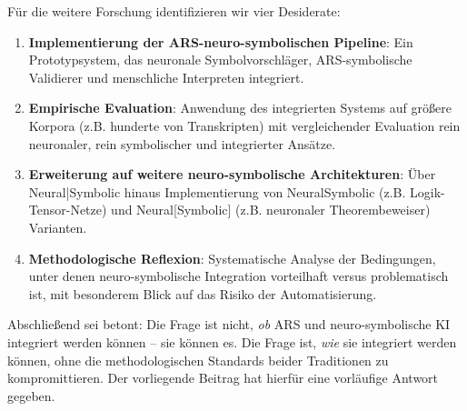 \documentclass[12pt,a4paper]{article}
\begin{document}
Für die weitere Forschung identifizieren wir vier Desiderate:

\begin{enumerate}
    \item \textbf{Implementierung der ARS-neuro-symbolischen Pipeline}: Ein 
    Prototypsystem, das neuronale Symbolvorschläger, ARS-symbolische Validierer 
    und menschliche Interpreten integriert.
    
    \item \textbf{Empirische Evaluation}: Anwendung des integrierten Systems auf 
    größere Korpora (z.B. hunderte von Transkripten) mit vergleichender Evaluation 
    rein neuronaler, rein symbolischer und integrierter Ansätze.
    
    \item \textbf{Erweiterung auf weitere neuro-symbolische Architekturen}: Über 
    Neural|Symbolic hinaus Implementierung von NeuralSymbolic (z.B. Logik-Tensor-Netze) 
    und Neural[Symbolic] (z.B. neuronaler Theorembeweiser) Varianten.
    
    \item \textbf{Methodologische Reflexion}: Systematische Analyse der Bedingungen, 
    unter denen neuro-symbolische Integration vorteilhaft versus problematisch ist, 
    mit besonderem Blick auf das Risiko der Automatisierung.
\end{enumerate}

Abschließend sei betont: Die Frage ist nicht, \textit{ob} ARS und neuro-symbolische 
KI integriert werden können – sie können es. Die Frage ist, \textit{wie} sie 
integriert werden können, ohne die methodologischen Standards beider Traditionen 
zu kompromittieren. Der vorliegende Beitrag hat hierfür eine vorläufige Antwort 
gegeben.
\end{document}

